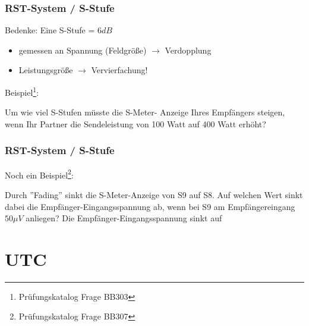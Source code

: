 \begin{frame}
    \frametitle{RST-System / S-Stufe}

    Bedenke: Eine S-Stufe = $6 dB$

    \begin{itemize}
        \item gemessen an Spannung (Feldgröße) $\rightarrow$ Verdopplung
        \item Leistungsgröße $\rightarrow$ Vervierfachung!
    \end{itemize}

    \vspace{1cm}

    Beispiel\footnote{Prüfungskatalog Frage BB303}:    

    \begin{block}{Um wie viel S-Stufen müsste die S-Meter- Anzeige Ihres
                  Empfängers steigen, wenn Ihr Partner die Sendeleistung von 100
                  Watt auf 400 Watt erhöht?}
    \end{block}

\end{frame}

\begin{frame}
    \frametitle{RST-System / S-Stufe}

    Noch ein Beispiel\footnote{Prüfungskatalog Frage BB307}:    

    \begin{block}{Durch ''Fading'' sinkt die S-Meter-Anzeige von S9 auf S8. Auf
                  welchen Wert sinkt dabei die Empfänger-Eingangsspannung ab,
                  wenn bei S9 am Empfängereingang $50\mu V$ anliegen? Die
                  Empfänger-Eingangsspannung sinkt auf}
    \end{block}

\end{frame}

\section{UTC}

